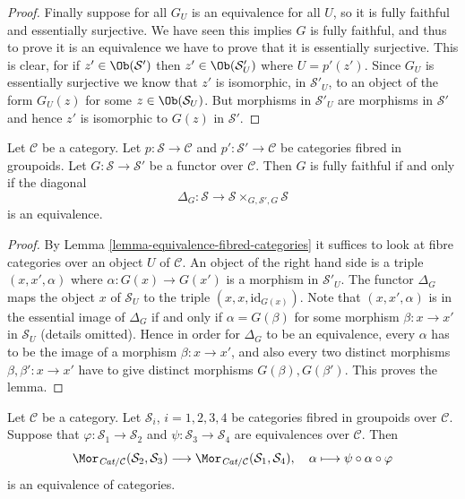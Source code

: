 \begin{proof}
\medskip\noindent
Finally suppose for all $G_U$ is an equivalence for all $U$, so it is
fully faithful and essentially surjective. We have seen this implies $G$ is
fully faithful, and thus to prove it is an equivalence we have to prove that
it is essentially surjective. This is clear, for if $z'\in
\Ob(\mathcal{S}')$ then $z'\in \Ob(\mathcal{S}'_U)$ where
$U = p'(z')$. Since $G_U$ is essentially surjective we know that
$z'$ is isomorphic, in $\mathcal{S}'_U$, to an object of the form
$G_U(z)$ for some $z\in \Ob(\mathcal{S}_U)$. But morphisms
in $\mathcal{S}'_U$ are morphisms in $\mathcal{S}'$ and hence $z'$ is
isomorphic to $G(z)$ in $\mathcal{S}'$.
\end{proof}

\begin{lemma}
\label{lemma-fully-faithful-diagonal-equivalence}
Let $\mathcal{C}$ be a category. Let $p : \mathcal{S}\to \mathcal{C}$ and
$p' : \mathcal{S'}\to \mathcal{C}$ be categories fibred in groupoids.
Let $G : \mathcal{S}\to \mathcal {S}'$ be a functor over $\mathcal{C}$.
Then $G$ is fully faithful if and only if the diagonal
$$
\Delta_G :
\mathcal{S}
\longrightarrow
\mathcal{S} \times_{G, \mathcal{S}', G} \mathcal{S}
$$
is an equivalence.
\end{lemma}

\begin{proof}
By
Lemma \ref{lemma-equivalence-fibred-categories}
it suffices to look at fibre categories over an object $U$ of $\mathcal{C}$.
An object of the right hand side is a triple $(x, x', \alpha)$ where
$\alpha : G(x) \to G(x')$ is a morphism in $\mathcal{S}'_U$.
The functor $\Delta_G$ maps the object $x$ of $\mathcal{S}_U$
to the triple $(x, x, \text{id}_{G(x)})$. Note that $(x, x', \alpha)$
is in the essential image of $\Delta_G$ if and only if $\alpha = G(\beta)$
for some morphism $\beta : x \to x'$ in $\mathcal{S}_U$ (details omitted).
Hence in order for $\Delta_G$ to be an equivalence, every $\alpha$ has to
be the image of a morphism $\beta : x \to x'$, and also every two
distinct morphisms $\beta, \beta' : x \to x'$ have to give distinct
morphisms $G(\beta), G(\beta')$. This proves the lemma.
\end{proof}

\begin{lemma}
\label{lemma-morphisms-equivalent-fibred-groupoids}
Let $\mathcal{C}$ be a category.
Let $\mathcal{S}_i$, $i = 1, 2, 3, 4$ be categories fibred in
groupoids over $\mathcal{C}$.
Suppose that $\varphi : \mathcal{S}_1 \to \mathcal{S}_2$ and
$\psi : \mathcal{S}_3 \to \mathcal{S}_4$ are equivalences
over $\mathcal{C}$. Then
$$
\Mor_{\textit{Cat}/\mathcal{C}}(\mathcal{S}_2, \mathcal{S}_3)
\longrightarrow
\Mor_{\textit{Cat}/\mathcal{C}}(\mathcal{S}_1, \mathcal{S}_4),
\quad \alpha \longmapsto \psi \circ \alpha \circ \varphi
$$
is an equivalence of categories.
\end{lemma}

